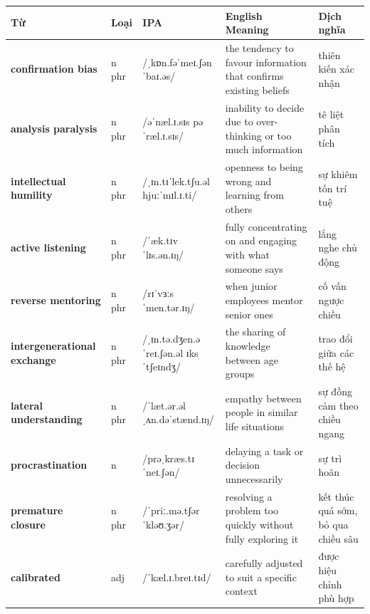\separator


\vspace{0.8em}
\begin{center}
\renewcommand{\arraystretch}{1.65}
\begin{tabularx}{\textwidth}{|V{0.22\textwidth}|C{0.07\textwidth}|I{0.20\textwidth}|Y|V{0.18\textwidth}|}
\hline
{}
\textbf{Từ} & \textbf{Loại} & \textbf{IPA} & \textbf{English Meaning} & \textbf{Dịch nghĩa} \\
\hline
\textbf{confirmation bias} & n phr & /ˌkɒn.fəˈmeɪ.ʃən ˈbaɪ.əs/ & the tendency to favour information that confirms existing beliefs & thiên kiến xác nhận \\ \hline
\textbf{analysis paralysis} & n phr & /əˈnæl.ɪ.sɪs pəˈræl.ɪ.sɪs/ & inability to decide due to over-thinking or too much information & tê liệt phân tích \\ \hline
\textbf{intellectual humility} & n phr & /ˌɪn.tɪˈlek.tʃu.əl hjuːˈmɪl.ɪ.ti/ & openness to being wrong and learning from others & sự khiêm tốn trí tuệ \\ \hline
\textbf{active listening} & n phr & /ˈæk.tɪv ˈlɪs.ən.ɪŋ/ & fully concentrating on and engaging with what someone says & lắng nghe chủ động \\ \hline
\textbf{reverse mentoring} & n phr & /rɪˈvɜːs ˈmen.tər.ɪŋ/ & when junior employees mentor senior ones & cố vấn ngược chiều \\ \hline
\textbf{intergenerational exchange} & n phr & /ˌɪn.tə.dʒen.əˈreɪ.ʃən.əl ɪksˈtʃeɪndʒ/ & the sharing of knowledge between age groups & trao đổi giữa các thế hệ \\ \hline
\textbf{lateral understanding} & n phr & /ˈlæt.ər.əl ˌʌn.dəˈstænd.ɪŋ/ & empathy between people in similar life situations & sự đồng cảm theo chiều ngang \\ \hline
\textbf{procrastination} & n & /prəˌkræs.tɪˈneɪ.ʃən/ & delaying a task or decision unnecessarily & sự trì hoãn \\ \hline
\textbf{premature closure} & n phr & /ˈpriː.mə.tʃər ˈkləʊ.ʒər/ & resolving a problem too quickly without fully exploring it & kết thúc quá sớm, bỏ qua chiều sâu \\ \hline
\textbf{calibrated} & adj & /ˈkæl.ɪ.breɪ.tɪd/ & carefully adjusted to suit a specific context & được hiệu chỉnh phù hợp \\ \hline
\end{tabularx}
\end{center}

